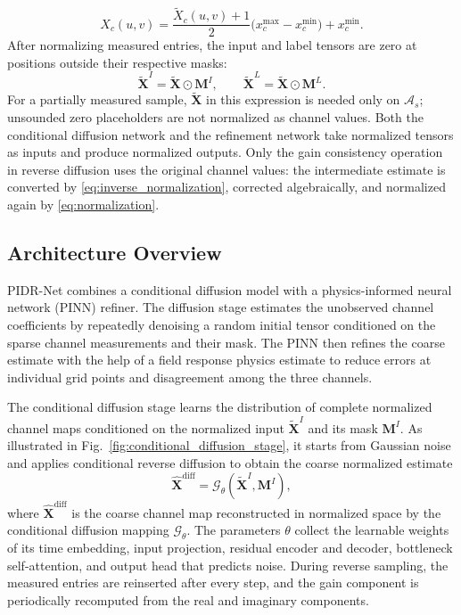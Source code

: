 \documentclass[lettersize,journal]{IEEEtran}
\newcommand{\mat}[1]{\mathbf{#1}}
\newcommand{\od}{\odot}
\begin{document}
\begin{equation}
    X_c(u,v)=\frac{\widetilde{X}_c(u,v)+1}{2}\big(x_c^{\max}-x_c^{\min}\big)+x_c^{\min}.
    \label{eq:inverse_normalization}
\end{equation}
After normalizing measured entries, the input and label tensors are zero at positions outside their respective masks:
\begin{equation}
    \widetilde{\mat{X}}^{I}=\widetilde{\mat{X}}\od\mat{M}^{I},\qquad
    \widetilde{\mat{X}}^{L}=\widetilde{\mat{X}}\od\mat{M}^{L}.
    \label{eq:normalized_input_label_maps}
\end{equation}
For a partially measured sample, $\widetilde{\mat{X}}$ in this expression is needed only on $\mathcal{A}_s$; unsounded zero placeholders are not normalized as channel values.
Both the conditional diffusion network and the refinement network take normalized tensors as inputs and produce normalized outputs. Only the gain consistency operation in reverse diffusion uses the original channel values: the intermediate estimate is converted by \eqref{eq:inverse_normalization}, corrected algebraically, and normalized again by \eqref{eq:normalization}.

\subsection{Architecture Overview}

PIDR-Net combines a conditional diffusion model with a physics-informed neural network (PINN) refiner. The diffusion stage estimates the unobserved channel coefficients by repeatedly denoising a random initial tensor conditioned on the sparse channel measurements and their mask. The PINN then refines the coarse estimate with the help of a field response physics estimate to reduce errors at individual grid points and disagreement among the three channels.

The conditional diffusion stage learns the distribution of complete normalized channel maps conditioned on the normalized input $\widetilde{\mat{X}}^{I}$ and its mask $\mat{M}^{I}$. As illustrated in Fig.~\ref{fig:conditional_diffusion_stage}, it starts from Gaussian noise and applies conditional reverse diffusion to obtain the coarse normalized estimate
\begin{equation}
    \widehat{\mat{X}}^{\mathrm{diff}}=\mathcal{G}_{\theta}(\widetilde{\mat{X}}^{I},\mat{M}^{I}),
    \label{eq:diff_stage}
\end{equation}
where $\widehat{\mat{X}}^{\mathrm{diff}}$ is the coarse channel map reconstructed in normalized space by the conditional diffusion mapping $\mathcal{G}_{\theta}$. The parameters $\theta$ collect the learnable weights of its time embedding, input projection, residual encoder and decoder, bottleneck self-attention, and output head that predicts noise. During reverse sampling, the measured entries are reinserted after every step, and the gain component is periodically recomputed from the real and imaginary components.
\end{document}
